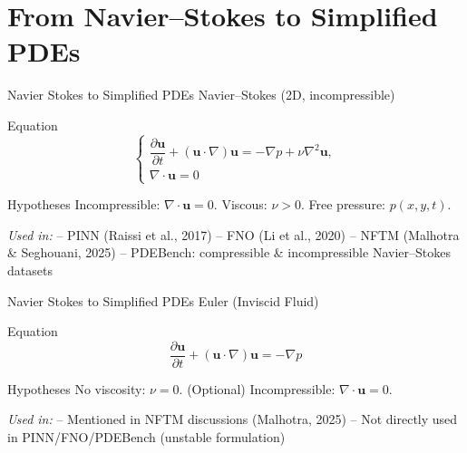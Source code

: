 \section{From Navier--Stokes to Simplified PDEs}

\begin{frame}{Navier Stokes to Simplified PDEs}
\small
\textcolor{red_unipd}{\Large Navier--Stokes (2D, incompressible)}

\vspace{0.6em}

\begin{alertblock}{Equation}
\[
\begin{cases}
\dfrac{\partial \mathbf{u}}{\partial t} 
+ (\mathbf{u}\!\cdot\!\nabla)\mathbf{u}
= -\nabla p + \nu\nabla^2 \mathbf{u},\\[4pt]
\nabla\!\cdot\!\mathbf{u} = 0
\end{cases}
\]
\end{alertblock}

\begin{block}{Hypotheses}
Incompressible: \(\nabla\!\cdot\!\mathbf{u} = 0\). \quad
Viscous: \(\nu>0\). \quad
Free pressure: \(p(x,y,t)\).
\end{block}

\vspace{0.5em}
\textit{Used in:}  
– PINN (Raissi et al., 2017)  
– FNO (Li et al., 2020)  
– NFTM (Malhotra \& Seghouani, 2025)  
– PDEBench: compressible \& incompressible Navier–Stokes datasets
\end{frame}


\begin{frame}{Navier Stokes to Simplified PDEs}
\small
\textcolor{red_unipd}{\Large Euler (Inviscid Fluid)}

\vspace{0.6em}

\begin{alertblock}{Equation}
\[
\dfrac{\partial \mathbf{u}}{\partial t} 
+ (\mathbf{u}\!\cdot\!\nabla)\mathbf{u}
= -\nabla p
\]
\end{alertblock}

\begin{block}{Hypotheses}
No viscosity: \(\nu = 0\). \quad
(Optional) Incompressible: \(\nabla\!\cdot\!\mathbf{u}=0\).
\end{block}

\vspace{0.5em}
\textit{Used in:}  
– Mentioned in NFTM discussions (Malhotra, 2025)  
– Not directly used in PINN/FNO/PDEBench (unstable formulation)
\end{frame}


